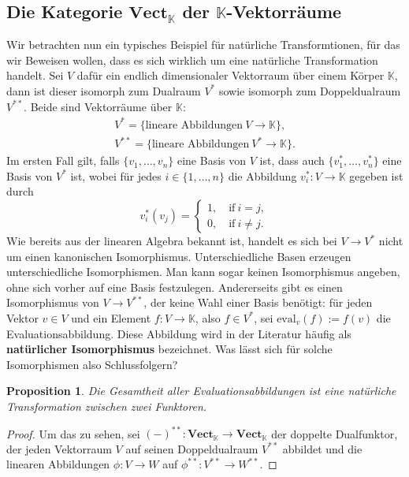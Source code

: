 \documentclass{article}
\theoremstyle{plain}
\newtheorem{prop}[thm]{Proposition}
\theoremstyle{definition}
\theoremstyle{remark}
\begin{document}
\subsection{Die Kategorie $\textbf{Vect}_{\mathbb{K}}$ der $\mathbb{K}$-Vektorräume}
Wir betrachten nun ein typisches Beispiel für natürliche Transformtionen, für das wir Beweisen wollen, dass es sich wirklich um eine natürliche Transformation handelt. Sei $V$ dafür ein endlich dimensionaler Vektorraum über einem Körper $\mathbb{K}$, dann ist dieser isomorph zum Dualraum $V^*$ sowie isomorph zum Doppeldualraum $V^{**}$. Beide sind Vektorräume über $\mathbb{K}$:
\begin{align}
	V^* = \{ \text{lineare Abbildungen} \ V \rightarrow \mathbb{K} \}, \\
	V^{**} = \{ \text{lineare Abbildungen} \ V^* \rightarrow \mathbb{K} \}.
\end{align}
Im ersten Fall gilt, falls $\{v_1, \ldots, v_n\}$ eine Basis von $V$ ist, dass auch $\{v_1^*, \ldots, v_n^*\}$ eine Basis von $V^*$ ist, wobei für jedes $i \in \{1, \ldots, n\}$ die Abbildung $v_i^*: V \rightarrow \mathbb{K}$ gegeben ist durch
\begin{equation}
	v_i^*(v_j) = \begin{cases}
	1, \quad \text{if} \ i = j, \\
	0, \quad \text{if} \ i \neq j.
	\end{cases}
\end{equation}
Wie bereits aus der linearen Algebra bekannt ist, handelt es sich bei $V \rightarrow V^*$ nicht um einen kanonischen Isomorphismus. Unterschiedliche Basen erzeugen unterschiedliche Isomorphismen. Man kann sogar keinen Isomorphismus angeben, ohne sich vorher auf eine Basis festzulegen. Andererseits gibt es einen Isomorphismus von $V \rightarrow V^{**}$, der keine Wahl einer Basis benötigt: für jeden Vektor $v \in V$ und ein Element $f: V \rightarrow \mathbb{K}$, also $f \in V^*$, sei $\text{eval}_v(f) := f(v)$ die Evaluationsabbildung. Diese Abbildung wird in der Literatur häufig als \textbf{natürlicher Isomorphismus} bezeichnet. Was lässt sich für solche Isomorphismen also Schlussfolgern?

\begin{prop}
Die Gesamtheit aller Evaluationsabbildungen ist eine natürliche Transformation zwischen zwei Funktoren.
\end{prop}

\begin{proof}
Um das zu sehen, sei $(-)^{**}: \textbf{Vect}_{\mathbb{K}} \rightarrow \textbf{Vect}_{\mathbb{K}}$ der doppelte Dualfunktor, der jeden Vektorraum $V$ auf seinen Doppeldualraum $V^{**}$ abbildet und die linearen Abbildungen $\phi: V \rightarrow W$ auf $\phi^{**}: V^{**} \rightarrow W^{**}$.
\end{proof}
\end{document}

